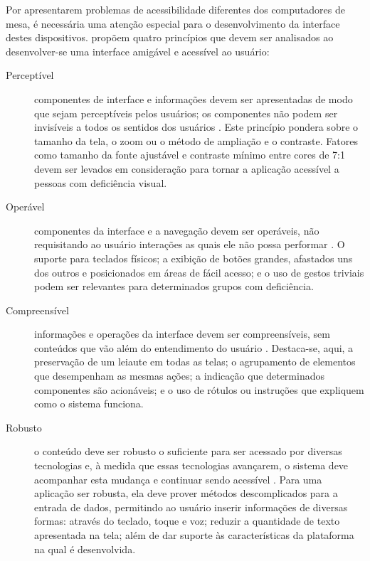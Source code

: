 Por apresentarem problemas de acessibilidade diferentes dos computadores de mesa, é necessária uma atenção especial para o desenvolvimento da interface destes dispositivos. \cite{WCAG20} propõem quatro princípios que devem ser analisados ao desenvolver-se uma interface amigável e acessível ao usuário:
\begin{description}
    \item [Perceptível] componentes de interface e informações devem ser apresentadas de modo que sejam perceptíveis pelos usuários; os componentes não podem ser invisíveis a todos os sentidos dos usuários \cite{W3C20}. Este princípio pondera sobre o tamanho da tela, o zoom ou o método de ampliação e o contraste. Fatores como tamanho da fonte ajustável e contraste mínimo entre cores de 7:1 devem ser levados em consideração para tornar a aplicação acessível a pessoas com deficiência visual.
    \item [Operável] componentes da interface e a navegação devem ser operáveis, não requisitando ao usuário interações as quais ele não possa performar \cite{W3C20}. O suporte para teclados físicos; a exibição de botões grandes, afastados uns dos outros e posicionados em áreas de fácil acesso; e o uso de gestos triviais podem ser relevantes para determinados grupos com deficiência.
    \item [Compreensível] informações e operações da interface devem ser compreensíveis, sem conteúdos que vão além do entendimento do usuário \cite{W3C20}. Destaca-se, aqui, a preservação de um leiaute em todas as telas; o agrupamento de elementos que desempenham as mesmas ações; a indicação que determinados componentes são acionáveis; e o uso de rótulos ou instruções que expliquem como o sistema funciona.
    \item [Robusto] o conteúdo deve ser robusto o suficiente para ser acessado por diversas tecnologias e, à medida que essas tecnologias avançarem, o sistema deve acompanhar esta mudança e continuar sendo acessível \cite{W3C20}. Para uma aplicação ser robusta, ela deve prover métodos descomplicados para a entrada de dados, permitindo ao usuário inserir informações de diversas formas: através do teclado, toque e voz; reduzir a quantidade de texto apresentada na tela; além de dar suporte às características da plataforma na qual é desenvolvida.
\end{description}

